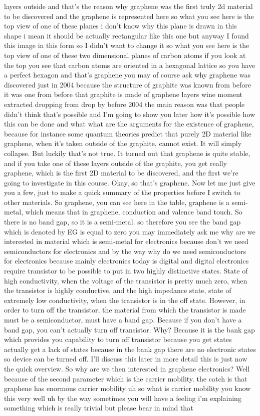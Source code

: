 layers outside and that's the reason why graphene was the first truly 2d material to be discovered and the graphene is represented here so what you see here is the top view of one of these planes i don't know why this plane is drawn in this shape i mean it should be actually rectangular like this one but anyway I found this image in this form so I didn't want to change it so what you see here is the top view of one of these two dimensional planes of carbon atoms if you look at the top you see that carbon atoms are oriented in a hexagonal lattice so you have a perfect hexagon and that's graphene you may of course ask why graphene was discovered just in 2004 because the structure of graphite was known from before it was one from before that graphite is made of graphene layers wine moment extracted dropping from drop by before 2004 the main reason was that people didn't think that's possible and I'm going to show you later how it's possible how this can be done and what what are the arguments for the existence of graphene, because for instance some quantum theories predict that purely 2D material like graphene, when it's taken outside of the graphite, cannot exist. It will simply collapse. But luckily that's not true. It turned out that graphene is quite stable, and if you take one of these layers outside of the graphite, you get really graphene, which is the first 2D material to be discovered, and the first we're going to investigate in this course. Okay, so that's graphene. Now let me just give you a few, just to make a quick summary of the properties before I switch to other materials. So graphene, you can see here in the table, graphene is a semi-metal, which means that in graphene, conduction and valence band touch. So there is no band gap, so it is a semi-metal. so therefore you see the band gap which is denoted by EG is equal to zero you may immediately ask me why are we interested in material which is semi-metal for electronics because don't we need semiconductors for electronics and by the way why do we need semiconductors for electronics because mainly electronics today is digital and digital electronics require transistor to be possible to put in two highly distinctive states. State of high conductivity, when the voltage of the transistor is pretty much zero, when the transistor is highly conductive, and the high impedance state, state of extremely low conductivity, when the transistor is in the off state. However, in order to turn off the transistor, the material from which the transistor is made must be a semiconductor, must have a band gap. Because if you don't have a band gap, you can't actually turn off transistor. Why? Because it is the bank gap which provides you capability to turn off transistor because you get states actually get a lack of states because in the bank gap there are no electronic states so device can be turned off. I'll discuss this later in more detail this is just now the quick overview. So why are we then interested in graphene electronics? Well because of the second parameter which is the carrier mobility. the catch is that graphene has enormous carrier mobility uh so what is carrier mobility you know this very well uh by the way sometimes you will have a feeling i'm explaining something which is really trivial but please bear in mind that 